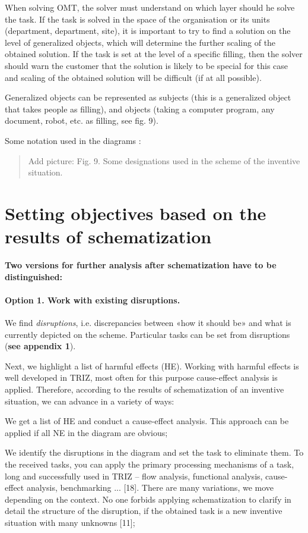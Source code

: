 \documentclass[11pt,a4paper]{book}
\newcommand{\addpicture}[1]{
  \begin{quote} Add picture: #1\end{quote}
}
\begin{document}
When solving OMT, the solver must understand on which layer should he solve
the task.  If the task is solved in the space of the organisation or its units
(department, department, site), it is important to try to find a solution on
the level of generalized objects, which will determine the further scaling of
the obtained solution.  If the task is set at the level of a specific filling,
then the solver should warn the customer that the solution is likely to be
special for this case and scaling of the obtained solution will be difficult
(if at all possible).

Generalized objects can be represented as subjects (this is a generalized
object that takes people as filling), and objects (taking a computer program,
any document, robot, etc. as filling, see fig. 9).

Some notation used in the diagrams :

\addpicture{Fig. 9. Some designations used in the scheme of the inventive
  situation.} 

\section{Setting objectives based on the results of schematization}

\textbf{Two versions for further analysis after schematization have to be
  distinguished:} 

\paragraph{Option 1. Work with existing disruptions.}
We find \emph{disruptions}, i.e.  discrepancies between «how it should be» and
what is currently depicted on the scheme. Particular tasks can be set from
disruptions (\textbf{see appendix 1}).

Next, we highlight a list of harmful effects (HE). Working with harmful
effects is well developed in TRIZ, most often for this purpose cause-effect
analysis is applied. Therefore, according to the results of schematization of
an inventive situation, we can advance in a variety of ways:

We get a list of HE and conduct a cause-effect analysis. This approach can be
applied if all NE in the diagram are obvious;

We identify the disruptions in the diagram and set the task to eliminate them.
To the received tasks, you can apply the primary processing mechanisms of a
task, long and successfully used in TRIZ -- flow analysis, functional
analysis, cause-effect analysis, benchmarking ... [18]. There are many
variations, we move depending on the context. No one forbids applying
schematization to clarify in detail the structure of the disruption, if the
obtained task is a new inventive situation with many unknowns [11];
\end{document}
